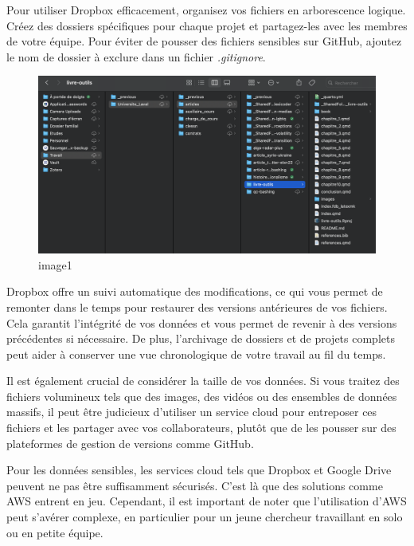 \documentclass[
  letterpaper,
  DIV=11,
  numbers=noendperiod]{scrreprt}
\begin{document}
Pour utiliser Dropbox efficacement, organisez vos fichiers en
arborescence logique. Créez des dossiers spécifiques pour chaque projet
et partagez-les avec les membres de votre équipe. Pour éviter de pousser
des fichiers sensibles sur GitHub, ajoutez le nom de dossier à exclure
dans un fichier \emph{.gitignore}.

\begin{figure}[H]

{\centering \includegraphics{images/chapitre8_dropbox.png}

}

\caption{image1}

\end{figure}%

Dropbox offre un suivi automatique des modifications, ce qui vous permet
de remonter dans le temps pour restaurer des versions antérieures de vos
fichiers. Cela garantit l'intégrité de vos données et vous permet de
revenir à des versions précédentes si nécessaire. De plus, l'archivage
de dossiers et de projets complets peut aider à conserver une vue
chronologique de votre travail au fil du temps.

Il est également crucial de considérer la taille de vos données. Si vous
traitez des fichiers volumineux tels que des images, des vidéos ou des
ensembles de données massifs, il peut être judicieux d'utiliser un
service cloud pour entreposer ces fichiers et les partager avec vos
collaborateurs, plutôt que de les pousser sur des plateformes de gestion
de versions comme GitHub.

Pour les données sensibles, les services cloud tels que Dropbox et
Google Drive peuvent ne pas être suffisamment sécurisés. C'est là que
des solutions comme AWS entrent en jeu. Cependant, il est important de
noter que l'utilisation d'AWS peut s'avérer complexe, en particulier
pour un jeune chercheur travaillant en solo ou en petite équipe.
\end{document}

